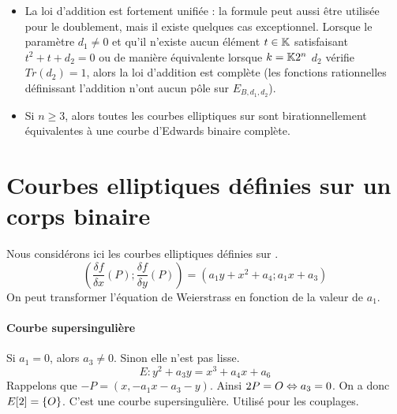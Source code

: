 \documentclass[a4paper]{report}
\begin{document}
\begin{itemize}[label=--]
    \item La loi d'addition est fortement unifiée : la formule peut aussi être utilisée pour le doublement, mais il existe quelques cas exceptionnel. Lorsque le paramètre $d_1 \neq 0$ et qu'il n'existe aucun élément $t \in \mathbb{K}{}$ satisfaisant $t^2 + t + d_2 = 0$ ou de manière équivalente lorsque $k = \mathbb{K}{2^n}$ $d_2$ vérifie $Tr(d_2) = 1$, alors la loi d'addition est complète (les fonctions rationnelles définissant l'addition n'ont aucun pôle sur $E_{B, d_1, d_2}$).
    \item Si $n \geq 3$, alors toutes les courbes elliptiques sur  sont birationnellement équivalentes à une courbe d'Edwards binaire complète.
\end{itemize}



\section{Courbes elliptiques définies sur un corps binaire}
Nous considérons ici les courbes elliptiques définies sur . 
\begin{equation}
\left (\frac{\delta f}{\delta x}(P); \frac{\delta f}{\delta y}(P) \right) = (a_1 y + x^2 + a_4; a_1 x + a_3)
\end{equation}
On peut transformer l'équation de Weierstrass en fonction de la valeur de $a_1$.

\paragraph{Courbe supersingulière}
Si $a_1 = 0$, alors $a_3 \neq 0$. Sinon elle n'est pas lisse. 
\begin{equation}
E : y^2 + a_3y = x^3 + a_4x + a_6
\end{equation}
Rappelons que $-P = (x, - a_1x - a_3 - y)$. Ainsi $2P = O{} \Leftrightarrow a_3 = 0$. On a donc $E[2] = \{O{}\}$. C'est une courbe supersingulière. Utilisé pour les couplages.
\end{document}
